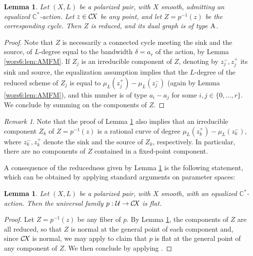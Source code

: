 \documentclass[10pt,a4paper]{article}
\numberwithin{equation}{section}
\newtheorem{lemma}[theorem]{Lemma}
\theoremstyle{definition}
\theoremstyle{remark}
\newtheorem{remark}[theorem]{Remark}
\def\C{{\mathbb C}}
\def\cU{{\mathcal U}}
\def\DA{{\rm A}}
\def\CX{\mathcal{C}\!X\hspace{-0.5pt}}
\begin{document}
\begin{lemma}\label{wors6:lem:reduced}
Let $(X,L)$ be a polarized pair, with $X$ smooth, admitting an equalized $\C^*$-action. 
Let $z\in \CX$ be any point, and let $Z=p^{-1}(z)$ be the corresponding cycle. 
Then $Z$ is reduced, and its dual graph 
 is of type $\DA$. 
\end{lemma}
\begin{proof}
Note that $Z$ is necessarily a connected cycle meeting the sink and the source, of $L$-degree equal to the bandwidth $\delta=a_r$ of the action, by Lemma \ref{wors6:lem:AMFM}. If $Z_j$ is an irreducible component of $Z$, denoting by $z_j^-,z_j^+$ its sink and source, the equalization assumption implies that the $L$-degree of the reduced scheme of $Z_j$ is equal to $\mu_L(z_j^+)-\mu_L(z_j^-)$ (again by Lemma \ref{wors6:lem:AMFM}), and this number is of type $a_{i}-a_{j}$ for some $i,j\in\{0,\dots,r\}$. We conclude by summing on the components of $Z$.
\end{proof}

\begin{remark}\label{wors6:rem:ratcomp}
Note that the proof of Lemma \ref{wors6:lem:reduced} also implies that an irreducible component $Z_k$ of $Z=p^{-1}(z)$  is a rational curve of degree $\mu_L(z_k^+)-\mu_L(z_k^-)$, where $z_k^-,z_k^+$ denote the sink and the source of $Z_k$, respectively.  In particular, there are no components of $Z$ contained in a fixed-point component.
\end{remark}

A consequence of the reducedness given by Lemma \ref{wors6:lem:reduced} is the following statement, which can be obtained by applying standard arguments on parameter spaces:

\begin{lemma}\label{wors6:lem:flat}
Let $(X,L)$ be a polarized pair, with $X$ smooth,  with an equalized $\C^*$-action.   
Then the universal family $p:\cU\to \CX$  is flat.
\end{lemma}

\begin{proof}
Let $Z=p^{-1}(z)$ be any fiber of $p$. By Lemma \ref{wors6:lem:reduced}, the components of $Z$ are all reduced, so that $Z$ is normal at the general point of each component and, since $\CX$ is normal, we may apply \cite[Theorem~I.6.6]{wors6-kollar} to claim that $p$ is flat at the general point of any component of $Z$. We then conclude by applying \cite[Theorem~I.7.3.1]{wors6-kollar}. 
\end{proof}
\end{document}
